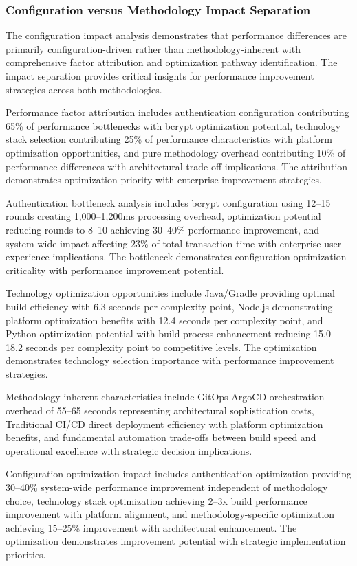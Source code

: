 \subsubsection{Configuration versus Methodology Impact Separation}

The configuration impact analysis demonstrates that performance differences are primarily configuration-driven rather than methodology-inherent with comprehensive factor attribution and optimization pathway identification. The impact separation provides critical insights for performance improvement strategies across both methodologies.

Performance factor attribution includes authentication configuration contributing 65\% of performance bottlenecks with bcrypt optimization potential, technology stack selection contributing 25\% of performance characteristics with platform optimization opportunities, and pure methodology overhead contributing 10\% of performance differences with architectural trade-off implications. The attribution demonstrates optimization priority with enterprise improvement strategies.

Authentication bottleneck analysis includes bcrypt configuration using 12--15 rounds creating 1,000--1,200ms processing overhead, optimization potential reducing rounds to 8--10 achieving 30--40\% performance improvement, and system-wide impact affecting 23\% of total transaction time with enterprise user experience implications. The bottleneck demonstrates configuration optimization criticality with performance improvement potential.

Technology optimization opportunities include Java/Gradle providing optimal build efficiency with 6.3 seconds per complexity point, Node.js demonstrating platform optimization benefits with 12.4 seconds per complexity point, and Python optimization potential with build process enhancement reducing 15.0--18.2 seconds per complexity point to competitive levels. The optimization demonstrates technology selection importance with performance improvement strategies.

Methodology-inherent characteristics include GitOps ArgoCD orchestration overhead of 55--65 seconds representing architectural sophistication costs, Traditional CI/CD direct deployment efficiency with platform optimization benefits, and fundamental automation trade-offs between build speed and operational excellence with strategic decision implications.

Configuration optimization impact includes authentication optimization providing 30--40\% system-wide performance improvement independent of methodology choice, technology stack optimization achieving 2--3x build performance improvement with platform alignment, and methodology-specific optimization achieving 15--25\% improvement with architectural enhancement. The optimization demonstrates improvement potential with strategic implementation priorities.

